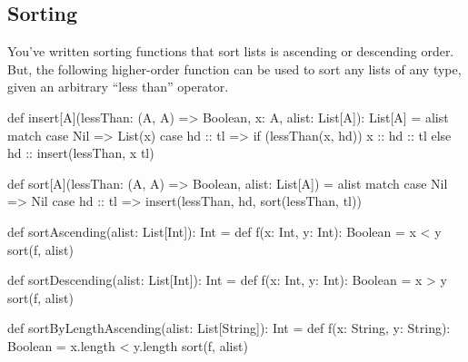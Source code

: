 \documentclass[9pt]{extbook}
\begin{document}




\subsection{Sorting}

You've written sorting functions that sort lists is ascending or descending
order. But, the following higher-order function can be used to sort any
lists of any type, given an arbitrary ``less than'' operator.

\begin{scalacode}
def insert[A](lessThan: (A, A) => Boolean, x: A, alist: List[A]): List[A] = alist match {
  case Nil => List(x)
  case hd :: tl => {
    if (lessThan(x, hd)) {
      x :: hd :: tl
    }
    else {
      hd :: insert(lessThan, x tl)
    }
  }
}

def sort[A](lessThan: (A, A) => Boolean, alist: List[A]) = alist match {
  case Nil => Nil
  case hd :: tl => insert(lessThan, hd, sort(lessThan, tl))
}

def sortAscending(alist: List[Int]): Int = {
  def f(x: Int, y: Int): Boolean = x < y
  sort(f, alist)
}

def sortDescending(alist: List[Int]): Int = {
  def f(x: Int, y: Int): Boolean = x > y
  sort(f, alist)
}

def sortByLengthAscending(alist: List[String]): Int = {
  def f(x: String, y: String): Boolean = x.length < y.length
  sort(f, alist)
}
\end{scalacode}
\end{document}
